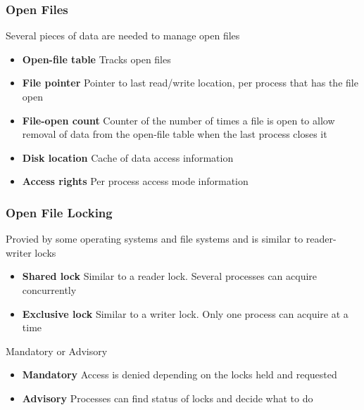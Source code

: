\documentclass{book/custombook}
\begin{document}
                \subsubsection{Open Files}
                    Several pieces of data are needed to manage open files
                    \begin{itemize}
                        \item \textbf{Open-file table}
                            \subitem Tracks open files
                        \item \textbf{File pointer}
                            \subitem Pointer to last read/write location, per process that has the file open
                        \item \textbf{File-open count}
                            \subitem Counter of the number of times a file is open to allow removal of data from the open-file table
                            when the last process closes it
                        \item \textbf{Disk location}
                            \subitem Cache of data access information
                        \item \textbf{Access rights}
                            \subitem Per process access mode information
                    \end{itemize}
                \subsubsection{Open File Locking}
                    Provied by some operating systems and file systems and is similar to reader-writer locks
                    \begin{itemize}
                        \item \textbf{Shared lock}
                            \subitem Similar to a reader lock. Several processes can acquire concurrently
                        \item \textbf{Exclusive lock}
                            \subitem Similar to a writer lock. Only one process can acquire at a time
                    \end{itemize}
                    Mandatory or Advisory
                    \begin{itemize}
                        \item \textbf{Mandatory}
                            \subitem Access is denied depending on the locks held and requested
                        \item \textbf{Advisory}
                            \subitem Processes can find status of locks and decide what to do
                    \end{itemize}
\end{document}
